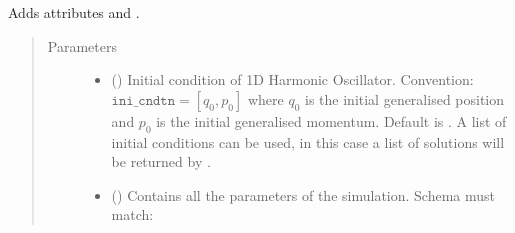 \documentclass[a4paper,landscape,10pt,english]{sphinxmanual}
\begin{document}
\begin{fulllineitems}
\begin{fulllineitems}
Adds attributes
{\hyperref[\detokenize{code_docs/simulation_api.simulation:simulation_api.simulation.simulations.HarmonicOsc1D.m}]{}} and
{\hyperref[\detokenize{code_docs/simulation_api.simulation:simulation_api.simulation.simulations.HarmonicOsc1D.k}]{}}.
\begin{quote}\begin{description}
\item[{Parameters}] \leavevmode\begin{itemize}
\item {} 
 (\sphinxstyleliteralemphasis{\sphinxupquote{, }}\sphinxstyleliteralemphasis{\sphinxupquote{ (}}\sphinxstyleliteralemphasis{\sphinxupquote{,}}\sphinxstyleliteralemphasis{\sphinxupquote{)}}) \textendash{} Initial condition of 1D Harmonic Oscillator. Convention:
\(\texttt{ini_cndtn} = [q_0, p_0]\) where \(q_0\) is the initial
generalised position and \(p_0\) is the initial generalised
momentum. Default is \sphinxcode{\sphinxupquote{{[}0., 1.{]}}}. A list of initial conditions
can be used, in this case a list of solutions will be returned by
{\hyperref[\detokenize{code_docs/simulation_api.simulation:simulation_api.simulation.simulations.Simulation.simulate}]{}}.

\item {} 
 (\sphinxstyleliteralemphasis{\sphinxupquote{, }}) \textendash{} 
Contains all the parameters of the simulation. Schema must match:

\begin{sphinxVerbatim}[commandchars=\\\{\}]
          
          
\end{sphinxVerbatim}


\end{itemize}
\end{description}
\end{quote}
\end{fulllineitems}
\end{fulllineitems}
\end{document}
